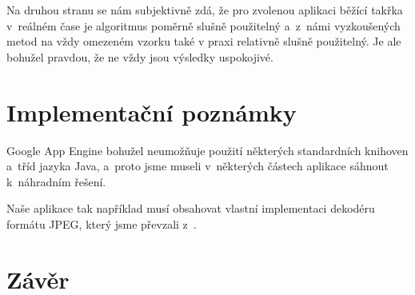 \documentclass[12pt,oneside,a4paper]{article}
\begin{document}
Na druhou stranu se nám subjektivně zdá, že pro zvolenou aplikaci běžící takřka v~reálném čase je algoritmus poměrně slušně použitelný a~z~námi vyzkoušených metod na vždy omezeném vzorku také v praxi relativně slušně použitelný. Je ale bohužel pravdou, že ne vždy jsou výsledky uspokojivé.

\section{Implementační poznámky}

Google App Engine bohužel neumožňuje použití některých standardních knihoven a~tříd jazyka Java, a~proto jsme museli v~některých částech aplikace sáhnout k~náhradním řešení.

Naše aplikace tak například musí obsahovat vlastní implementaci dekodéru formátu JPEG, který jsme převzali z~\cite{Dersch}.

\section{Závěr}

\renewcommand{\refname}{Literatura}

{
 
}
\end{document}
